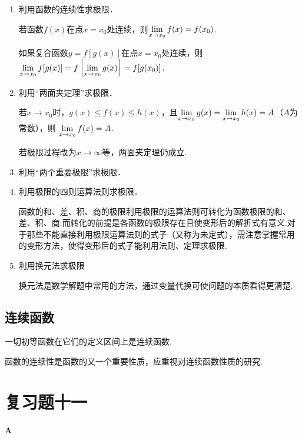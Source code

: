 \begin{enumerate}
    \item  利用函数的连续性求极限．

    若函数$f(x)$在点$x=x_0$处连续，则$\lim\limits_{x\to x_0}f(x)=f(x_0)$.

如果复合函数$y=f[g(x)]$在点$x=x_0$处连续，则$\lim\limits_{x\to x_0}f[g(x)]=f\left[\lim\limits_{x\to x_0}g(x)\right]=f[g(x_0)]$.
\item 利用“两面夹定理”求极限．

若$x\to x_0$时，$g(x)\le f(x)\le h(x)$，且$\lim\limits_{x\to x_0}g(x)=\lim\limits_{x\to x_0}h(x)=A$（$A$为常数），则
$\lim\limits_{x\to x_0}f(x)=A$.

\begin{rmk}
    若极限过程改为$x\to \infty$等，两面夹定理仍成立.
\end{rmk}

\item 利用“两个重要极限”求极限．
\item 利用极限的四则运算法则求极限．

函数的和、差、积、商的极限利用极限的运算法则可转化为函数极限的和、差、积、商.而转化的前提是各函数的极限存在且使变形后的解折式有意义.对于那些不能直接利用极限运算法则的式子（又称为未定式），需注意掌握常用的变形方法，使得变形后的式子能利用法则、定理求极限.
\item 利用换元法求极限

换元法是数学解题中常用的方法，通过变量代换可使问题的本质看得更清楚.
\end{enumerate}

\subsection{连续函数}
一切初等函数在它们的定义区间上是连续函数.

函数的连续性是函数的又一个重要性质，应重视对连续函数性质的研究.


\section*{复习题十一}
\begin{center}
    \bfseries A
\end{center}


